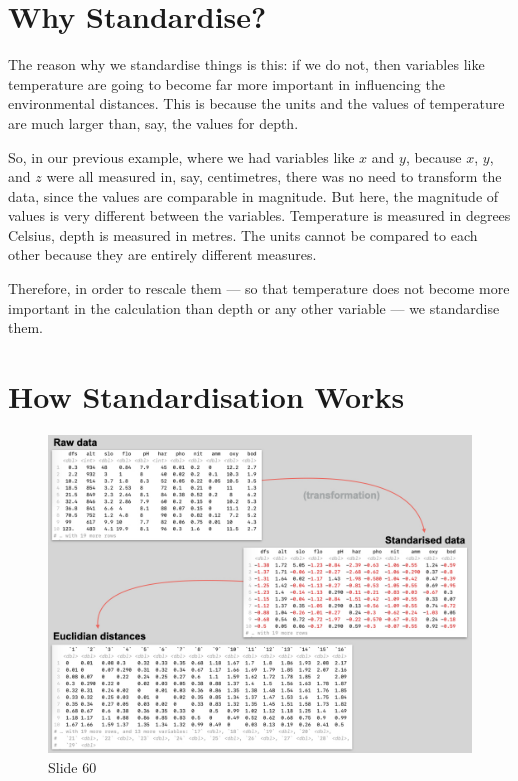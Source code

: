 \documentclass[
  11pt,
]{book}
\begin{document}
\section{Why Standardise?}\label{why-standardise}

The reason why we standardise things is this: if we do not, then
variables like temperature are going to become far more important in
influencing the environmental distances. This is because the units and
the values of temperature are much larger than, say, the values for
depth.

So, in our previous example, where we had variables like \(x\) and
\(y\), because \(x\), \(y\), and \(z\) were all measured in, say,
centimetres, there was no need to transform the data, since the values
are comparable in magnitude. But here, the magnitude of values is very
different between the variables. Temperature is measured in degrees
Celsius, depth is measured in metres. The units cannot be compared to
each other because they are entirely different measures.

Therefore, in order to rescale them --- so that temperature does not
become more important in the calculation than depth or any other
variable --- we standardise them.

\section{How Standardisation Works}\label{how-standardisation-works}

\begin{figure}[ht]
\centering
\includegraphics[width=0.8\linewidth]{../images/BDC334/BDC334-060.jpeg}
\caption*{Slide 60}
\end{figure}
\end{document}

